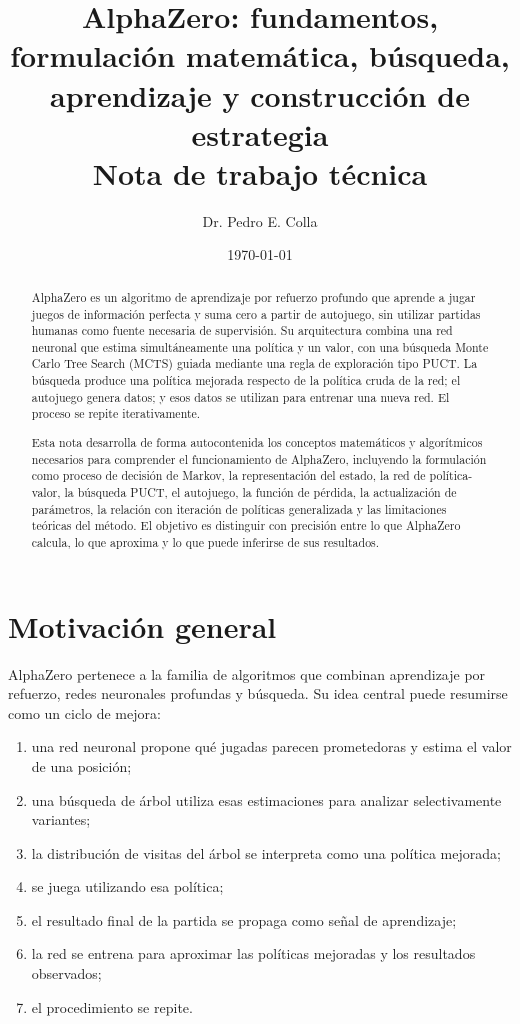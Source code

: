 \documentclass[11pt,a4paper]{article}
\title{\textbf{AlphaZero: fundamentos, formulación matemática, búsqueda, aprendizaje y construcción de estrategia}\\
\large Nota de trabajo técnica}
\author{Dr. Pedro E. Colla}
\date{\today}
\begin{document}
\maketitle
\tableofcontents
\newpage

\begin{abstract}
AlphaZero es un algoritmo de aprendizaje por refuerzo profundo que aprende a jugar juegos de información perfecta y suma cero a partir de autojuego, sin utilizar partidas humanas como fuente necesaria de supervisión. Su arquitectura combina una red neuronal que estima simultáneamente una política y un valor, con una búsqueda Monte Carlo Tree Search (MCTS) guiada mediante una regla de exploración tipo PUCT. La búsqueda produce una política mejorada respecto de la política cruda de la red; el autojuego genera datos; y esos datos se utilizan para entrenar una nueva red. El proceso se repite iterativamente.

Esta nota desarrolla de forma autocontenida los conceptos matemáticos y algorítmicos necesarios para comprender el funcionamiento de AlphaZero, incluyendo la formulación como proceso de decisión de Markov, la representación del estado, la red de política-valor, la búsqueda PUCT, el autojuego, la función de pérdida, la actualización de parámetros, la relación con iteración de políticas generalizada y las limitaciones teóricas del método. El objetivo es distinguir con precisión entre lo que AlphaZero calcula, lo que aproxima y lo que puede inferirse de sus resultados.
\end{abstract}

\section{Motivación general}

AlphaZero pertenece a la familia de algoritmos que combinan aprendizaje por refuerzo, redes neuronales profundas y búsqueda. Su idea central puede resumirse como un ciclo de mejora:

\begin{enumerate}[label=\arabic*.]
    \item una red neuronal propone qué jugadas parecen prometedoras y estima el valor de una posición;
    \item una búsqueda de árbol utiliza esas estimaciones para analizar selectivamente variantes;
    \item la distribución de visitas del árbol se interpreta como una política mejorada;
    \item se juega utilizando esa política;
    \item el resultado final de la partida se propaga como señal de aprendizaje;
    \item la red se entrena para aproximar las políticas mejoradas y los resultados observados;
    \item el procedimiento se repite.
\end{enumerate}
\end{document}
